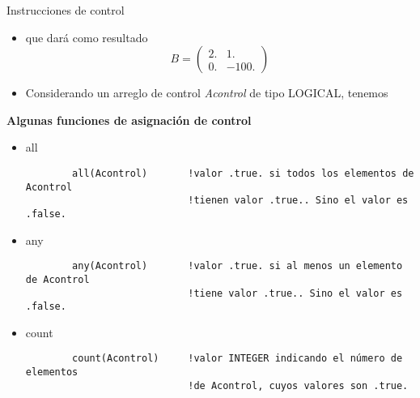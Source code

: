 \begin{frame}[fragile]{Instrucciones de control} 
    \begin{itemize}[<+(0)->]
        \item [] que dará como resultado
            $$
                B = \left( \begin{array}{cc}
                    2. & 1. \\
                    0. & -100. \end{array} \right)
            $$
        \item Considerando un arreglo de control \emph{Acontrol} de tipo LOGICAL, tenemos
    \end{itemize}
    \textbf{Algunas funciones de asignación de control}
    \begin{itemize}[<+(1)->]
        \item all \\ 
        \begin{verbatim}
        all(Acontrol)       !valor .true. si todos los elementos de Acontrol
                            !tienen valor .true.. Sino el valor es .false.
        \end{verbatim}
        \item any \\ 
        \begin{verbatim}
        any(Acontrol)       !valor .true. si al menos un elemento de Acontrol
                            !tiene valor .true.. Sino el valor es .false.
        \end{verbatim}
        \item count \\ 
        \begin{verbatim}
        count(Acontrol)     !valor INTEGER indicando el número de elementos 
                            !de Acontrol, cuyos valores son .true.
        \end{verbatim}                         
    \end{itemize}
\end{frame}



